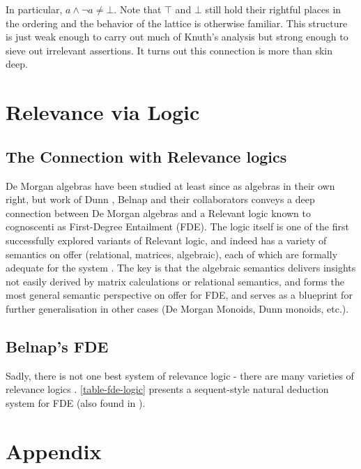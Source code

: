 \documentclass[11pt,a4paper]{article}
\theoremstyle{definition}
\begin{document}
In particular, $a \land \neg a \neq \bot$.%
\remark Note that $\top$ and $\bot$ still hold their rightful places in the ordering and the behavior of the lattice is otherwise familiar. This structure is just weak enough to carry out much of Knuth's analysis but strong enough to sieve out irrelevant assertions. It turns out this connection is more than skin deep.
\section{Relevance via Logic}
\subsection{The Connection with Relevance logics}
De Morgan algebras have been studied at least since \cite{10.2307/1993112} as algebras in their own right, but work of Dunn \cite{Dunn1999}, Belnap \cite{Belnap1977} and their collaborators \cite{anderson2017entailment} conveys a deep connection between De Morgan algebras and a Relevant logic known to cognoscenti as First-Degree Entailment (FDE). The logic itself is one of the first successfully explored variants of Relevant logic, and indeed has a variety of semantics on offer (relational, matrices, algebraic), each of which are formally adequate for the system \cite{omori201740}. The key is that the algebraic semantics delivers insights not easily derived by matrix calculations or relational semantics, and forms the most general semantic perspective on offer for FDE, and serves as a blueprint for further generalisation in other cases (De Morgan Monoids, Dunn monoids, etc.). 
\subsection{Belnap's FDE}
\par Sadly, there is not one best system of relevance logic - there are many varieties of relevance logics \cite{anderson2017entailment}. \ref{table-fde-logic} presents a sequent-style natural deduction system for FDE (also found in \cite{omori201740}).
\fi





\begingroup
\sloppy


 
\endgroup
\appendix


\newpage
\section*{Appendix}
\label{sec:appendix}
\end{document}
